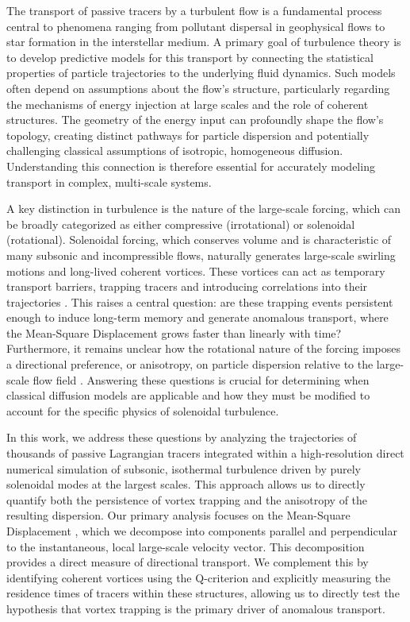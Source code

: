 \documentclass[]{article}
\begin{document}
The transport of passive tracers by a turbulent flow is a fundamental process central to phenomena ranging from pollutant dispersal in geophysical flows to star formation in the interstellar medium. A primary goal of turbulence theory is to develop predictive models for this transport by connecting the statistical properties of particle trajectories to the underlying fluid dynamics. Such models often depend on assumptions about the flow's structure, particularly regarding the mechanisms of energy injection at large scales and the role of coherent structures. The geometry of the energy input can profoundly shape the flow's topology, creating distinct pathways for particle dispersion and potentially challenging classical assumptions of isotropic, homogeneous diffusion. Understanding this connection is therefore essential for accurately modeling transport in complex, multi-scale systems.

A key distinction in turbulence is the nature of the large-scale forcing, which can be broadly categorized as either compressive (irrotational) or solenoidal (rotational). Solenoidal forcing, which conserves volume and is characteristic of many subsonic and incompressible flows, naturally generates large-scale swirling motions and long-lived coherent vortices. These vortices can act as temporary transport barriers, trapping tracers and introducing correlations into their trajectories \citep{freitas2026intermittencysuppressionturbulenceforced}. This raises a central question: are these trapping events persistent enough to induce long-term memory and generate anomalous transport, where the Mean-Square Displacement grows faster than linearly with time? Furthermore, it remains unclear how the rotational nature of the forcing imposes a directional preference, or anisotropy, on particle dispersion relative to the large-scale flow field \citep{mizerski2022anisotropicturbulentviscositylargescale}. Answering these questions is crucial for determining when classical diffusion models are applicable and how they must be modified to account for the specific physics of solenoidal turbulence.

In this work, we address these questions by analyzing the trajectories of thousands of passive Lagrangian tracers \citep{komorowski2005stationaritylagrangianobservationspassive} integrated within a high-resolution direct numerical simulation of subsonic, isothermal turbulence driven by purely solenoidal modes at the largest scales. This approach allows us to directly quantify both the persistence of vortex trapping and the anisotropy of the resulting dispersion. Our primary analysis focuses on the Mean-Square Displacement \citep{küchler2024lagrangianparticletrackinglarge}, which we decompose into components parallel and perpendicular to the instantaneous, local large-scale velocity vector. This decomposition provides a direct measure of directional transport. We complement this by identifying coherent vortices using the Q-criterion and explicitly measuring the residence times of tracers within these structures, allowing us to directly test the hypothesis that vortex trapping is the primary driver of anomalous transport.
\end{document}
